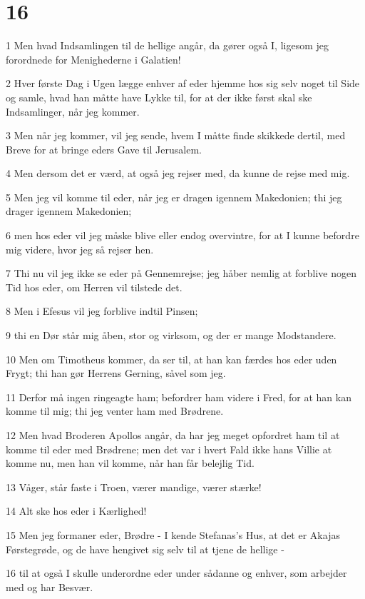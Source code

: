 \chapter{16}

\par 1 Men hvad Indsamlingen til de hellige angår, da gører også I, ligesom jeg forordnede for Menighederne i Galatien!
\par 2 Hver første Dag i Ugen lægge enhver af eder hjemme hos sig selv noget til Side og samle, hvad han måtte have Lykke til, for at der ikke først skal ske Indsamlinger, når jeg kommer.
\par 3 Men når jeg kommer, vil jeg sende, hvem I måtte finde skikkede dertil, med Breve for at bringe eders Gave til Jerusalem.
\par 4 Men dersom det er værd, at også jeg rejser med, da kunne de rejse med mig.
\par 5 Men jeg vil komme til eder, når jeg er dragen igennem Makedonien; thi jeg drager igennem Makedonien;
\par 6 men hos eder vil jeg måske blive eller endog overvintre, for at I kunne befordre mig videre, hvor jeg så rejser hen.
\par 7 Thi nu vil jeg ikke se eder på Gennemrejse; jeg håber nemlig at forblive nogen Tid hos eder, om Herren vil tilstede det.
\par 8 Men i Efesus vil jeg forblive indtil Pinsen;
\par 9 thi en Dør står mig åben, stor og virksom, og der er mange Modstandere.
\par 10 Men om Timotheus kommer, da ser til, at han kan færdes hos eder uden Frygt; thi han gør Herrens Gerning, såvel som jeg.
\par 11 Derfor må ingen ringeagte ham; befordrer ham videre i Fred, for at han kan komme til mig; thi jeg venter ham med Brødrene.
\par 12 Men hvad Broderen Apollos angår, da har jeg meget opfordret ham til at komme til eder med Brødrene; men det var i hvert Fald ikke hans Villie at komme nu, men han vil komme, når han får belejlig Tid.
\par 13 Våger, står faste i Troen, værer mandige, værer stærke!
\par 14 Alt ske hos eder i Kærlighed!
\par 15 Men jeg formaner eder, Brødre - I kende Stefanas's Hus, at det er Akajas Førstegrøde, og de have hengivet sig selv til at tjene de hellige -
\par 16 til at også I skulle underordne eder under sådanne og enhver, som arbejder med og har Besvær.
